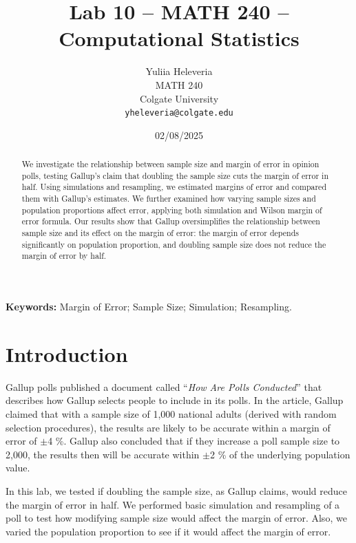 \documentclass{article}\usepackage[]{graphicx}\usepackage[]{xcolor}
\begin{document}
\vspace{-1in}
\title{Lab 10 -- MATH 240 -- Computational Statistics}

\author{
  Yuliia Heleveria \\
  MATH 240  \\
  Colgate University  \\
  {\tt yheleveria@colgate.edu}
}

\date{02/08/2025}

\maketitle

\begin{multicols}{2}
\raggedcolumns %
\begin{abstract}
We investigate the relationship between sample size and margin of error in opinion polls, testing Gallup's claim that doubling the sample size cuts the margin of error in half. Using simulations and resampling, we estimated margins of error and compared them with Gallup's estimates. We further examined how varying sample sizes and population proportions affect error, applying both simulation and Wilson margin of error formula. Our results show that Gallup oversimplifies the relationship between sample size and its effect on the margin of error: the margin of error depends significantly on population proportion, and doubling sample size does not reduce the margin of error by half.
\end{abstract}

\noindent \textbf{Keywords:} Margin of Error; Sample Size; Simulation; Resampling.

\section{Introduction} 

Gallup polls published a document called ``\textit{How Are Polls Conducted}'' that describes how Gallup selects people to include in its polls. In the article, Gallup claimed that with a sample size of 1,000 national adults (derived with random selection procedures), the results are likely to be accurate within a margin of error of  $\pm$4 \%. Gallup also concluded that if they increase a poll sample size to 2,000, the results then will be accurate within $\pm$2 \% of the underlying population value. 

In this lab, we tested if doubling the sample size, as Gallup claims, would reduce the margin of error in half. We performed basic simulation and resampling of a poll to test how modifying sample size would affect the margin of error. Also, we varied the population proportion to see if it would affect the margin of error.


\end{multicols}
\end{document}

